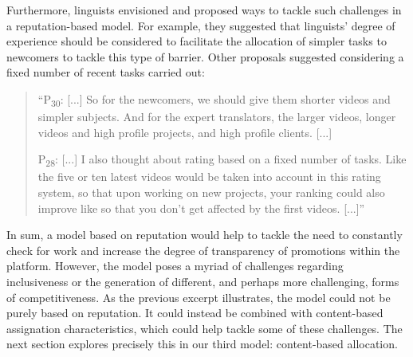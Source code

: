 Furthermore, linguists envisioned and proposed ways to tackle such challenges in a reputation-based model. For example, they suggested that linguists' degree of experience should be considered to facilitate the allocation of simpler tasks to newcomers to tackle this type of barrier. Other proposals suggested considering a fixed number of recent tasks carried out:

\begin{quote}
    ``P\textsubscript{30}: [...] So for the newcomers, we should give them shorter videos and simpler subjects. And for the expert translators, the larger videos, longer videos and high profile projects, and high profile clients. [...] 
    
    P\textsubscript{28}: [...] I also thought about rating based on a fixed number of tasks. Like the five or ten latest videos would be taken into account in this rating system, so that upon working on new projects, your ranking could also improve like so that you don't get affected by the first videos. [...]''
\end{quote}




In sum, a model based on reputation would help to tackle the need to constantly check for work and increase the degree of transparency of promotions within the platform. However, the model poses a myriad of challenges regarding inclusiveness or the generation of different, and perhaps more challenging, forms of competitiveness. As the previous excerpt illustrates, the model could not be purely based on reputation. It could instead be combined with content-based assignation characteristics, which could help tackle some of these challenges. The next section explores precisely this in our third model: content-based allocation.

